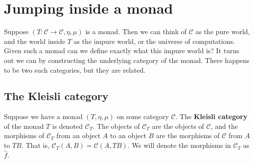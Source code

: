 \documentclass{article}
\let\mto\to
\let\to\relax
\newcommand{\to}{\rightarrow}
\newcommand{\cat}[1]{\mathcal{#1}}
\begin{document}
\section{Jumping inside a monad}
\label{sec:jumping_inside_a_monad}

Suppose $(T : \cat{C} \mto \cat{C},\eta,\mu)$ is a monad.  Then we can
think of $\cat{C}$ as the pure world, and the world inside $T$ as the
impure world, or the universe of computations.  Given such a monad can
we define exactly what this impure world is?  It turns out we can by
constructing the underlying category of the monad.  There happens to
be two such categories, but they are related.

\subsection{The Kleisli category}
\label{subsec:the_kleisli_category}
Suppose we have a monad $(T,\eta,\mu)$ on some category $\cat{C}$.
The \textbf{Kleisli category} of the monad $T$ is denoted $\cat{C}_T$.
The objects of $\cat{C}_T$ are the objects of $\cat{C}$, and the
morphisms of $\cat{C}_T$ from an object $A$ to an object $B$ are the
morphisms of $\cat{C}$ from $A$ to $TB$.  That is, $\cat{C}_T(A,B) =
\cat{C}(A,TB)$.  We will denote the morphisms in $\cat{C}_T$ as
$\hat{f}$.
\end{document}
